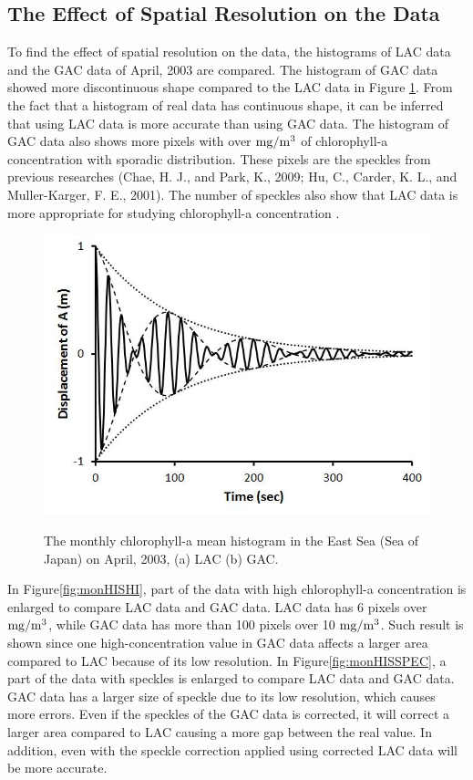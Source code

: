 \subsection{The Effect of Spatial Resolution on the Data}
 
To find the effect of spatial resolution on the data, the histograms of LAC data and the GAC data of April, 2003 are compared. The histogram of GAC data showed more discontinuous shape compared to the LAC data in Figure \ref{fig:monHIS}. From the fact that a histogram of real data has continuous shape, it can be inferred that using LAC data is more accurate than using GAC data. The histogram of GAC data also shows more pixels with over $\rm mg/m^3$ of chlorophyll-a concentration with sporadic distribution. These pixels are the speckles from previous researches (Chae, H. J., and Park, K., 2009; Hu, C., Carder, K. L., and Muller-Karger, F. E., 2001). The number of speckles also show that LAC data is more appropriate for studying chlorophyll-a concentration \cite{chae2009characteristics,hu2001precise}.
  
\begin{figure}[h]
	\centering
	\includegraphics[width=0.8\linewidth]{../images/monHIS}\\
	\caption{The monthly chlorophyll-a mean histogram in the East Sea (Sea of Japan) on April, 2003, (a) LAC (b) GAC.}
	\label{fig:monHIS}
\end{figure}
 
In Figure\ref{fig:monHISHI}, part of the data with high chlorophyll-a concentration is enlarged to compare LAC data and GAC data. LAC data has 6 pixels over $\rm mg/m^3$, while GAC data has more than 100 pixels over 10 $\rm mg/m^3$. Such result is shown since one high-concentration value in GAC data affects a larger area compared to LAC because of its low resolution.
In Figure\ref{fig:monHISSPEC}, a part of the data with speckles is enlarged to compare LAC data and GAC data. GAC data has a larger size of speckle due to its low resolution, which causes more errors. Even if the speckles of the GAC data is corrected, it will correct a larger area compared to LAC causing a more gap between the real value. In addition, even with the speckle correction applied using corrected LAC data will be more accurate.
    
